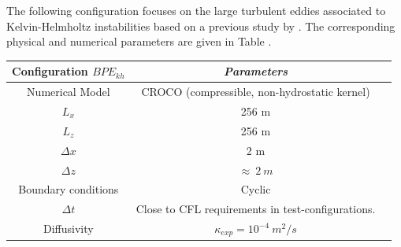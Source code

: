 The following configuration focuses on the large turbulent eddies associated to Kelvin-Helmholtz instabilities based on a previous study by \citet{penney_diapycnal_2019}. The corresponding physical and numerical parameters are given in Table .
\begin{table}[h]
        \centering
        \begin{tabular}{|c|c|c|}
                \hline
                Configuration $BPE_{kh}$ & \textit{Parameters}\\
                \hline 
                Numerical Model & CROCO (compressible, non-hydrostatic kernel)\\
                $L_x$ & 256 m\\
                $L_z$ & 256 m\\
                $\Delta x$ & 2 m\\
                $\Delta z$ & $\approx\ 2\ m$\\
                Boundary conditions & Cyclic\\
                $\Delta t$ & Close to CFL requirements in test-configurations.\\
                Diffusivity & $\kappa_{exp} = 10^{-4} \ m^2/s$\\
                \hline
        \end{tabular}
        \label{tab_BPE_KH}
\end{table}
